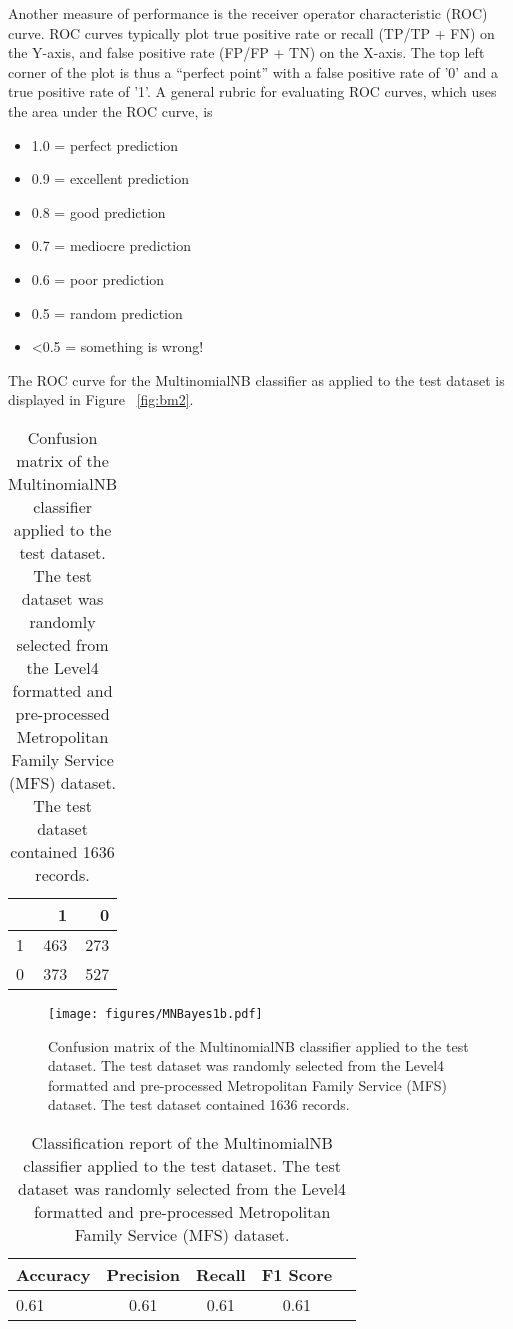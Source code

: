 \documentclass[twoside]{article}	%
\begin{document}
\noindent Another measure of performance is the receiver operator characteristic (ROC) curve. ROC curves typically plot true positive rate or recall (TP/TP + FN) on the Y-axis, and false positive rate (FP/FP + TN) on the X-axis. The top left corner of the plot is thus a \enquote{perfect point} with a false positive rate of '0' and a true positive rate of '1'. A general rubric for evaluating ROC curves, which uses the area under the ROC curve, is
\begin{itemize}
	\item 1.0 = perfect prediction
	\item 0.9 = excellent prediction
	\item 0.8 = good prediction
	\item 0.7 = mediocre prediction
	\item 0.6 = poor prediction
	\item 0.5 = random prediction
	\item <0.5 = something is wrong!
\end{itemize}
The ROC curve for the MultinomialNB classifier as applied to the test dataset is displayed in Figure ~\ref{fig:bm2}.

\begin{table} \centering 
  \caption{Confusion matrix of the MultinomialNB classifier applied to the test dataset. The test dataset was randomly selected from the Level4 formatted and pre-processed Metropolitan Family Service (MFS) dataset. The test dataset contained 1636 records.} 
  \label{tab:bm2} 
\begin{tabular}{lrr}
\toprule
{} &    1 &    0 \\
\midrule
1 &  463 &  273 \\
0 &  373 &  527 \\
\bottomrule
\end{tabular}
\end{table}


\begin{figure}
	\begin{center}
		\texttt{[image: figures/MNBayes1b.pdf]}
		\caption{Confusion matrix of the MultinomialNB classifier applied to the test dataset. The test dataset was randomly selected from the Level4 formatted and pre-processed Metropolitan Family Service (MFS) dataset. The test dataset contained 1636 records.}
		\label{fig:bm1}
	\end{center}
\end{figure}


\begin{table} \centering 
  \caption{Classification report of the MultinomialNB classifier applied to the test dataset. The test dataset was randomly selected from the Level4 formatted and pre-processed Metropolitan Family Service (MFS) dataset.} 
  \label{tab:bm3}
\begin{tabular}{lcccc}
\toprule
Accuracy & Precision & Recall & F1 Score\\
\midrule
0.61 & 0.61 & 0.61 & 0.61 \\
\bottomrule
\end{tabular}
\end{table}
\end{document}
